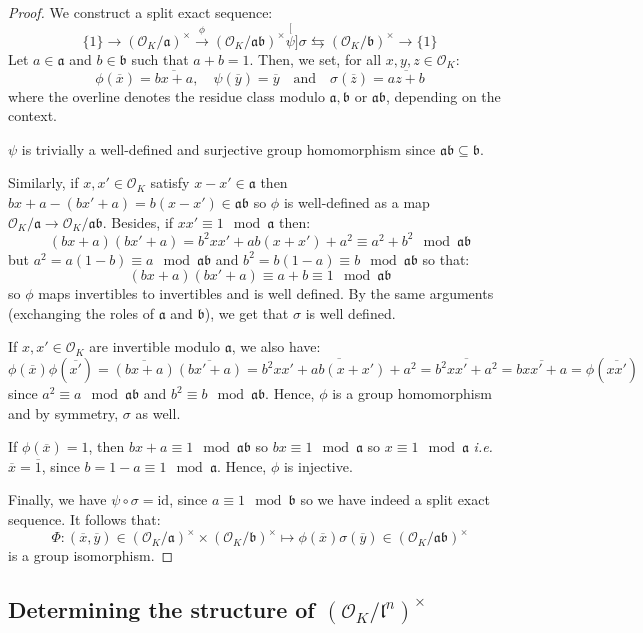\documentclass[a4paper,10pt]{report}
\theoremstyle{definition}
\theoremstyle{plain}
\theoremstyle{definition}
\newcommand{\ie}{\emph{i.e.}\ }
\newcommand{\mO}{\mathcal{O}}
\renewcommand{\(}{\left(}
\renewcommand{\)}{\right)}
\newcommand{\id}{\mbox{id}}
\newcommand{\mf}[1]{\mathfrak{#1}}
\begin{document}
\begin{proof}
We construct a split exact sequence:
\[\{1\}\longrightarrow(\mO_K/\mf{a})^\times\overset{\phi}{\longrightarrow}(\mO_K/\mf{a}\mf{b})^\times \stackrel[\psi]{\sigma}{\leftrightarrows}(\mO_K/\mf{b})^\times\longrightarrow\{1\}\]
Let $a\in\mf{a}$ and $b\in\mf{b}$ such that $a+b=1$. Then, we set, for all $x,y,z\in\mO_K$:
\[\phi(\overline{x})=\overline{bx+a}, \quad \psi(\overline{y})=\overline{y} \quad \mbox{and} \quad \sigma(\overline{z})=\overline{az+b}\]
where the overline denotes the residue class modulo $\mf{a}, \mf{b}$ or $\mf{a}\mf{b}$, depending on the context. 

$\psi$ is trivially a well-defined and surjective group homomorphism since $\mf{a}\mf{b}\subseteq\mf{b}$. 

Similarly, if $x,x'\in\mO_K$ satisfy $x-x'\in\mf{a}$ then $bx+a-(bx'+a)=b(x-x')\in\mf{a}\mf{b}$ so $\phi$ is well-defined as a map $\mO_K/\mf{a}\longrightarrow\mO_K/\mf{a}\mf{b}$. Besides, if $xx'\equiv 1 \mod \mf{a}$ then:
\[(bx+a)(bx'+a)=b^2xx'+ab(x+x')+a^2\equiv a^2+b^2 \mod \mf{a}\mf{b}\]
but $a^2=a(1-b)\equiv a \mod \mf{a}\mf{b}$ and $b^2=b(1-a)\equiv b \mod \mf{a}\mf{b}$ so that: 
\[(bx+a)(bx'+a)\equiv a+b\equiv 1 \mod \mf{a}\mf{b}\]
so $\phi$ maps invertibles to invertibles and is well defined. By the same arguments (exchanging the roles of $\mf{a}$ and $\mf{b}$), we get that $\sigma$ is well defined.

If $x,x'\in\mO_K$ are invertible modulo $\mf{a}$, we also have:
\[\phi(\overline{x})\phi(\overline{x'})=\overline{(bx+a)}\overline{(bx'+a)}=\overline{b^2xx'+ab(x+x')+a^2}=\overline{b^2xx'+a^2}=\overline{bxx'+a}=\phi(\overline{xx'})\]
since $a^2\equiv a \mod \mf{a}\mf{b}$ and $b^2\equiv b \mod \mf{a}\mf{b}$. Hence, $\phi$ is a group homomorphism and by symmetry, $\sigma$ as well.

If $\phi(\overline{x})=1$, then $bx+a\equiv 1 \mod \mf{a}\mf{b}$ so $bx\equiv 1 \mod \mf{a}$ so $x\equiv 1 \mod \mf{a}$ \ie $\overline{x}=\overline{1}$, since $b=1-a\equiv 1 \mod \mf{a}$. Hence, $\phi$ is injective.

Finally, we have $\psi\circ\sigma=\id$, since $a\equiv 1 \mod \mf{b}$ so we have indeed a split exact sequence. It follows that:
\[\Phi : (\overline{x},\overline{y})\in(\mO_K/\mf{a})^\times\times (\mO_K/\mf{b})^\times\longmapsto \phi(\overline{x})\sigma(\overline{y})\in(\mO_K/\mf{a}\mf{b})^\times\]
is a group isomorphism.
\end{proof}

\subsection{Determining the structure of $(\mO_K/\mf{l}^n)^\times$}
\end{document}
